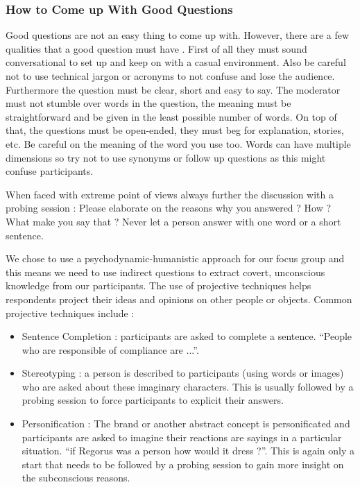 \documentclass[10pt]{report}
\begin{document}
\subsubsection{How to Come up With Good Questions}

Good questions are not an easy thing to come up with. However, there are a few qualities that a good question must have \autocite{Krueger2000}. First of all they must sound conversational to set up and keep on with a casual environment. Also be careful not to use technical jargon or acronyms to not confuse and lose the audience. Furthermore the question must be clear, short and easy to say. The moderator must not stumble over words in the question, the meaning must be straightforward and be given in the least possible number of words. On top of that, the questions must be open-ended, they must beg for explanation, stories, etc. Be careful on the meaning of the word you use too. Words can have multiple dimensions so try not to use synonyms or follow up questions as this might confuse participants.

When faced with extreme point of views always further the discussion with a probing session : Please elaborate on the reasons why you answered ? How ? What make you say that ? Never let a person answer with one word or a short sentence. 

We chose to use a psychodynamic-humanistic approach for our focus group and this means we need to use indirect questions to extract covert, unconscious knowledge from our participants. The use of projective techniques helps respondents project their ideas and opinions on other people or objects. Common projective techniques include : 
\begin{itemize}
\item Sentence Completion : participants are asked to complete a sentence. \enquote{People who are responsible of compliance are ...}.
\item Stereotyping : a person is described to participants (using words or images) who are asked about these imaginary characters. This is usually followed by a probing session to force participants to explicit their answers.
\item Personification : The brand or another abstract concept is personificated and participants are asked to imagine their reactions are sayings in a particular situation. \enquote{if Regorus was a person how would it dress ?}. This is again only a start that needs to be followed by a probing session to gain more insight on the subconscious reasons.
\end{itemize}
\end{document}
